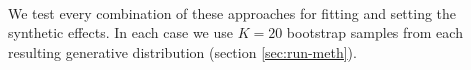 \paragraph{} We test every combination of these approaches for fitting and setting the synthetic effects. In each case we use $K=20$ bootstrap samples from each resulting generative distribution (section \ref{sec:run-meth}).

%
%
%
%
%
%

